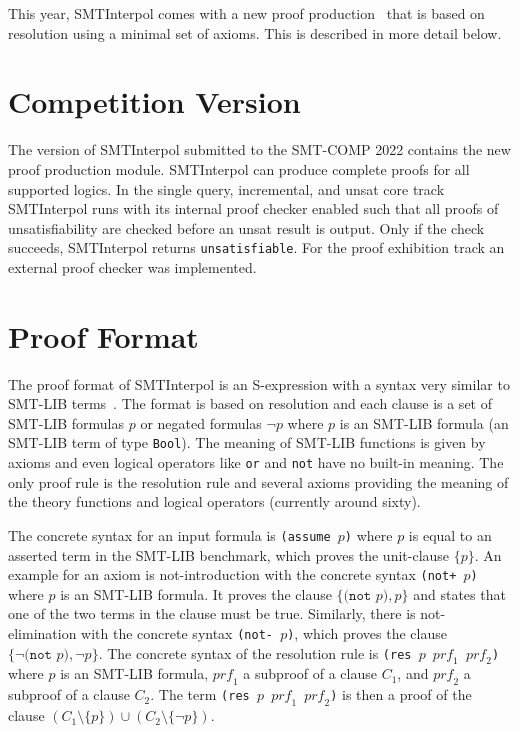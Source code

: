 \documentclass[a4paper]{easychair}
\newcommand\SI{SMTInterpol\xspace}
\newcommand\smtlib[1]{\texttt{#1}}
\newcommand\prf{\mathit{prf}}
\begin{document}
This year, \SI comes with a new proof production~\cite{DBLP:conf/smt/HoenickeS22} that is based on resolution using a minimal set of axioms.  This is described in more detail below.

\section*{Competition Version}
The version of \SI submitted to the SMT-COMP 2022 contains the new proof production module.
\SI can produce complete proofs for all supported logics.
In the single query, incremental, and unsat core track \SI runs with its internal proof checker enabled such that all proofs of unsatisfiability are checked before an unsat result is output.
Only if the check succeeds, \SI returns \texttt{unsatisfiable}.
For the proof exhibition track an external proof checker was implemented.

\section*{Proof Format}

The proof format of \SI is an S-expression with a syntax very similar to SMT-LIB terms~\cite{DBLP:conf/smt/HoenickeS22}.
The format is based on resolution and each clause is a set of SMT-LIB formulas $p$ or negated formulas $\lnot p$ where $p$ is an SMT-LIB formula (an SMT-LIB term of type \smtlib{Bool}).
The meaning of SMT-LIB functions is given by axioms and even logical operators like \smtlib{or} and \smtlib{not} have no built-in meaning.
The only proof rule is the resolution rule and several axioms providing the meaning of the theory functions and logical operators (currently around sixty).

The concrete syntax for an input formula is \smtlib{(assume $p$)} where $p$ is equal to an asserted term in the SMT-LIB benchmark, which proves the unit-clause $\{ p \}$.
An example for an axiom is not-introduction with the concrete syntax \smtlib{(not+ $p$)} where $p$ is an SMT-LIB formula.
It proves the clause $\{ \smtlib{(not $p$)}, p \}$ and states that one of the two terms in the clause must be true.
Similarly, there is not-elimination with the concrete syntax \smtlib{(not- $p$)}, which proves the clause $\{ \lnot \smtlib{(not $p$)}, \lnot \smtlib{$p$}\}$.
The concrete syntax of the resolution rule is \smtlib{(res $p$ $\prf_1$ $\prf_2$)} where $p$ is an SMT-LIB formula, $\prf_1$ a subproof of a clause $C_1$, and $\prf_2$ a subproof of a clause $C_2$.
The term \smtlib{(res $p$ $\prf_1$ $\prf_2$)} is then a proof of the clause $(C_1\setminus\{p\}) \cup (C_2\setminus\{\lnot p\})$.
\end{document}

